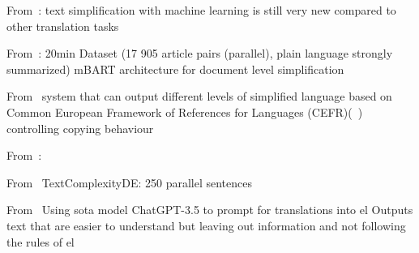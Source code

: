 From~\autocite{schomacker2023data}:
text simplification with machine learning is still very new compared to other translation tasks

From~\autocite{rios-etal-2021-new}:
20min Dataset (17 905 article pairs (parallel), plain language strongly summarized)
mBART architecture for document level simplification

From~\autocite{spring-etal-2021-exploring}
system that can output different levels of simplified language based on Common European Framework of References for Languages (CEFR)(~\autocite{Ansch_tz_2023})
controlling copying behaviour

From~\autocite{salar-mohtaj-babak-naderi-2022-overview}:


From~\autocite{naderi2019subjective}
TextComplexityDE: 250 parallel sentences

From~\autocite{deilen2023using}
Using sota model ChatGPT-3.5 to prompt for translations into \gls{el}
Outputs text that are easier to understand but leaving out information and not following the rules of \gls{el}